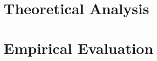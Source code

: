 \documentclass[letterpaper]{article}
\numberwithin{equation}{section}
\numberwithin{theorem}{section}
\numberwithin{lemma}{section}
\numberwithin{df}{section}
\begin{document}

\section{Theoretical Analysis}



\section{Empirical Evaluation}


\end{document}
